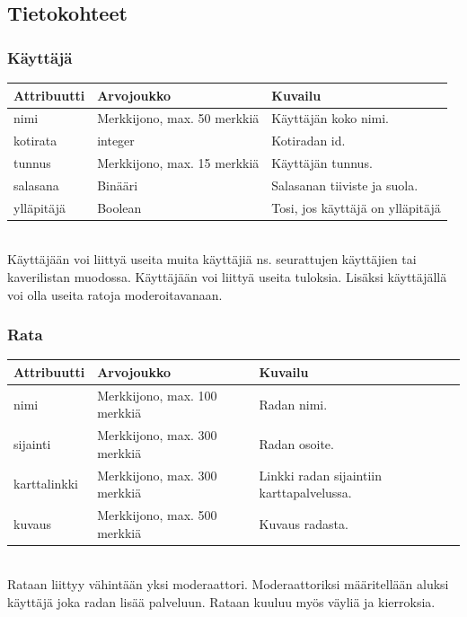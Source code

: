 \documentclass[10pt,a4paper]{article}
\begin{document}
\subsection{Tietokohteet}
\subsubsection{Käyttäjä}
    \begin{tabular}{ | l | p{3cm} | p{5cm} |}
    \hline
    Attribuutti & Arvojoukko & Kuvailu\\ \hline
    nimi & Merkkijono, max. 50 merkkiä & Käyttäjän koko nimi. \\ \hline
    kotirata & integer & Kotiradan id. \\ \hline
    tunnus & Merkkijono, max. 15 merkkiä & Käyttäjän tunnus. \\ \hline
    salasana & Binääri & Salasanan tiiviste ja suola. \\ \hline
    ylläpitäjä & Boolean & Tosi, jos käyttäjä on ylläpitäjä \\ \hline
    \end{tabular}\\
Käyttäjään voi liittyä useita muita käyttäjiä ns. seurattujen käyttäjien tai kaverilistan muodossa. Käyttäjään voi liittyä useita tuloksia. Lisäksi käyttäjällä voi olla useita ratoja moderoitavanaan.
\subsubsection{Rata}
    \begin{tabular}{ | l | p{3cm} | p{5cm} |}
    \hline
    Attribuutti & Arvojoukko & Kuvailu\\ \hline
    nimi & Merkkijono, max. 100 merkkiä & Radan nimi. \\ \hline
    sijainti & Merkkijono, max. 300 merkkiä & Radan osoite. \\ \hline
    karttalinkki & Merkkijono, max. 300 merkkiä & Linkki radan sijaintiin karttapalvelussa. \\ \hline
    kuvaus & Merkkijono, max. 500 merkkiä & Kuvaus radasta. \\ \hline
    \end{tabular}\\
Rataan liittyy vähintään yksi moderaattori. Moderaattoriksi määritellään aluksi käyttäjä joka radan lisää palveluun. Rataan kuuluu myös väyliä ja kierroksia.
\end{document}
